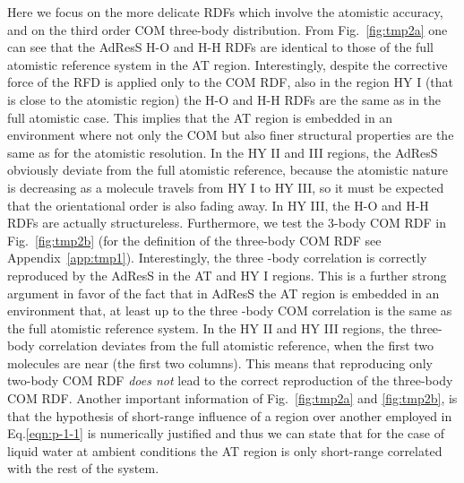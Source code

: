 \documentclass[aip,jcp,a4paper,reprint,onecolumn]{revtex4-1}
\begin{document}
Here we focus on the more delicate RDFs which involve the atomistic accuracy, and on the third order COM three-body distribution. From Fig.~\ref{fig:tmp2a} one can see that
the AdResS H-O and H-H RDFs are identical to those of 
the full atomistic reference system in the AT region.
Interestingly, despite the corrective force of the RFD is applied only to the COM RDF, also in the region HY I (that is close to the atomistic region) the H-O and H-H RDFs are the same as in the full atomistic case.
This implies that the AT region
is embedded in an environment where not only the COM but also finer structural
properties are the same as for the atomistic resolution.
In the HY II and III regions, the AdResS obviously deviate from the
full atomistic reference, because the atomistic nature 
is decreasing as a molecule travels from HY I to HY III, so it must be expected 
that the orientational order is also fading away. In HY III, the H-O and H-H
RDFs are actually structureless.
Furthermore, we test the 3-body COM RDF in Fig.~\ref{fig:tmp2b} (for the definition of the three-body COM RDF see Appendix~\ref{app:tmp1}).
Interestingly, the three -body correlation is correctly reproduced
by the AdResS in the AT and HY I  regions. This is a further strong argument in favor of the fact that in AdResS the AT region is embedded in an environment that, at least up to the three -body COM correlation is the same as the full atomistic reference system.
In the HY II and HY III regions, the three-body correlation deviates from the
full atomistic reference, when the first two molecules are near (the first
two columns). This means that reproducing only two-body COM RDF \emph{does not}
lead to the correct reproduction of the three-body COM RDF.
Another important information of Fig.~\ref{fig:tmp2a} and \ref{fig:tmp2b},
is that the hypothesis of short-range influence of a region over another employed in Eq.\ref{eqn:p-1-1} is numerically justified and thus we can state that for the case of liquid water at ambient conditions the AT region is only short-range
correlated with the rest of the system.
\end{document}
